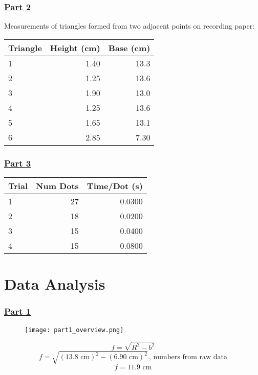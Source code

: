 \documentclass[fleqn]{article}
\begin{document}
\subsubsection*{\underline{Part 2}}
Measurements of triangles formed from two adjacent points on recording paper:
\begin{table}[H]
	\setlength{\extrarowheight}{1pt}
	\begin{tabular}{|l|r|r|}
		\hline
		Triangle & Height (cm) & Base (cm) \\ \hline
		1        & 1.40        & 13.3      \\ \hline
		2        & 1.25        & 13.6      \\ \hline
		3        & 1.90        & 13.0      \\ \hline
		4        & 1.25        & 13.6      \\ \hline
		5        & 1.65        & 13.1      \\ \hline
		6        & 2.85        & 7.30      \\ \hline
	\end{tabular}
\end{table}

\subsubsection*{\underline{Part 3}}
\begin{table}[H]
	\setlength{\extrarowheight}{1pt}
	\begin{tabular}{|l|r|r|}
		\hline
		Trial & Num Dots & Time/Dot (s) \\ \hline
		1     & 27       & 0.0300       \\ \hline
		2     & 18       & 0.0200       \\ \hline
		3     & 15       & 0.0400       \\ \hline
		4     & 15       & 0.0800       \\ \hline
	\end{tabular}
\end{table}

\section*{Data Analysis}
\subsubsection*{\underline{Part 1}}
\begin{figure}[H]
	\texttt{[image: part1\_overview.png]}
\end{figure}
\[ f = \sqrt{R^2 - b^2}  \]
\[ f = \sqrt{(13.8 \text{ cm} )^2 - (6.90 \text{ cm} )^2}\,  \text{, numbers from raw data}  \]
\[ f = 11.9 \text{ cm}  \]
\end{document}
